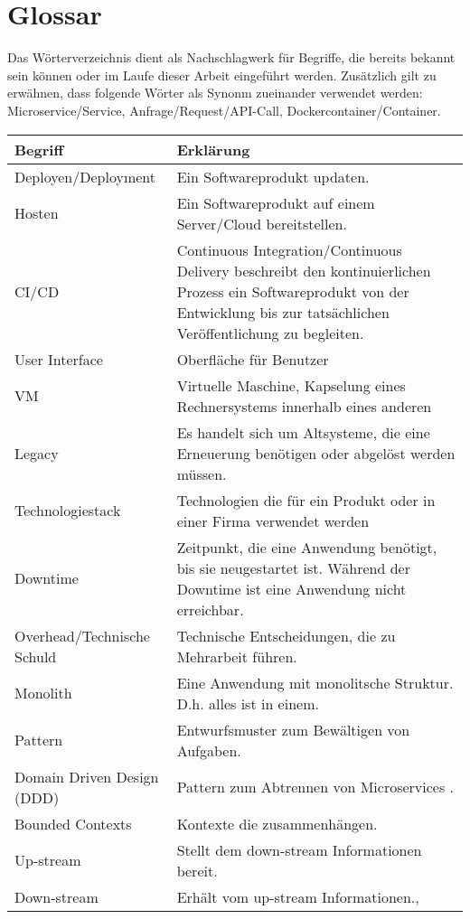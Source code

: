 \section{Glossar}

Das Wörterverzeichnis dient als Nachschlagwerk für Begriffe, die bereits bekannt sein können oder im Laufe dieser Arbeit eingeführt werden. Zusätzlich gilt zu erwähnen, dass folgende Wörter als Synonm zueinander verwendet werden: Microservice/Service, Anfrage/Request/API-Call, Dockercontainer/Container. 

\begin{longtable}{lp{10cm}}
	Begriff & Erklärung \\ \hline
	Deployen/Deployment & Ein Softwareprodukt updaten.  \\
	Hosten & Ein Softwareprodukt auf einem Server/Cloud bereitstellen. \\
	CI/CD & Continuous Integration/Continuous Delivery beschreibt den kontinuierlichen Prozess ein Softwareprodukt von der Entwicklung bis zur tatsächlichen Veröffentlichung zu begleiten.\\
	User Interface  & Oberfläche für Benutzer  \\
	VM & Virtuelle Maschine, Kapselung eines Rechnersystems innerhalb eines anderen  \\
	Legacy & Es handelt sich um Altsysteme, die eine Erneuerung benötigen oder abgelöst werden müssen. \\
	Technologiestack & Technologien die für ein Produkt oder in einer Firma verwendet werden  \\
	Downtime & Zeitpunkt, die eine Anwendung benötigt, bis sie neugestartet ist. Während der Downtime ist eine Anwendung nicht erreichbar.  \\
	Overhead/Technische Schuld & Technische Entscheidungen, die zu Mehrarbeit führen. \\
	Monolith & Eine Anwendung mit monolitsche Struktur. D.h. alles ist in einem. \\ 
	Pattern & Entwurfsmuster zum Bewältigen von Aufgaben.\\
	Domain Driven Design (DDD) & Pattern zum Abtrennen von Microservices .\\ 
	Bounded Contexts & Kontexte die zusammenhängen. \\
	Up-stream & Stellt dem down-stream Informationen bereit. \\
	Down-stream & Erhält vom up-stream Informationen., \\

\end{longtable}
